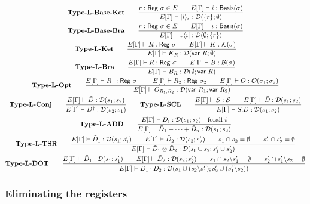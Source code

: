 \begin{gather*}
    \textbf{Type-L-Base-Ket}\qquad 
    \frac{r : \mathsf{Reg}\  \sigma \in E\qquad E[\Gamma] \vdash i : \mathsf{Basis}(\sigma)}{E[\Gamma] \vdash |i\rangle_r : \mathcal{D}(\{r\}; \emptyset)} \\
    \textbf{Type-L-Base-Bra}\qquad 
    \frac{r : \mathsf{Reg}\  \sigma \in E \qquad E[\Gamma] \vdash i : \mathsf{Basis}(\sigma)}{E[\Gamma] \vdash {}_r\langle i| : \mathcal{D}(\emptyset; \{r\})} \\
    \textbf{Type-L-Ket}\qquad 
    \frac{E[\Gamma] \vdash R : \mathsf{Reg}\  \sigma\qquad E[\Gamma] \vdash K : \mathcal{K}(\sigma)}{E[\Gamma] \vdash K_R : \mathcal{D}(\mathsf{var}\  R; \emptyset)} \\
    \textbf{Type-L-Bra}\qquad 
    \frac{E[\Gamma] \vdash R : \mathsf{Reg}\  \sigma\qquad E[\Gamma] \vdash B : \mathcal{B}(\sigma)}{E[\Gamma] \vdash B_R : \mathcal{D}(\emptyset; \mathsf{var}\  R)} \\
    \textbf{Type-L-Opt}\qquad 
    \frac{E[\Gamma] \vdash R_1 : \mathsf{Reg}\  \sigma_1\qquad 
    E[\Gamma] \vdash R_2 : \mathsf{Reg}\  \sigma_2\qquad 
    E[\Gamma] \vdash O : \mathcal{O}(\sigma_1; \sigma_2)}
    {E[\Gamma] \vdash O_{R_1;R_2} : \mathcal{D}(\mathsf{var}\  R_1; \mathsf{var}\  R_2)} \\
    \textbf{Type-L-Conj}\qquad 
    \frac{E[\Gamma] \vdash \tilde{D} : \mathcal{D}(s_1;s_2)}{E[\Gamma] \vdash \tilde{D}^\dagger : \mathcal{D}(s_2;s_1)} \qquad
    \textbf{Type-L-SCL}\qquad 
    \frac{E[\Gamma] \vdash S : \mathcal{S}\qquad E[\Gamma] \vdash \tilde{D} : \mathcal{D}(s_1;s_2)}{E[\Gamma] \vdash S.\tilde{D} : \mathcal{D}(s_1;s_2)} \\
    \textbf{Type-L-ADD}\qquad
    \frac{E[\Gamma] \vdash \tilde{D}_i : \mathcal{D}(s_1;s_2)\quad \text{forall } i}{E[\Gamma] \vdash \tilde{D}_1+\cdots+\tilde{D}_n : \mathcal{D}(s_1;s_2)} \\
    \textbf{Type-L-TSR}\qquad
    \frac{E[\Gamma] \vdash \tilde{D}_1 : \mathcal{D}(s_1;s_1')\qquad E[\Gamma] \vdash \tilde{D}_2 : \mathcal{D}(s_2;s_2')\qquad s_1\cap s_2 = \emptyset\qquad s_1'\cap s_2' = \emptyset}{E[\Gamma] \vdash \tilde{D}_1\otimes\tilde{D}_2 : \mathcal{D}(s_1\cup s_2;s_1'\cup s_2')} \\
    \textbf{Type-L-DOT}\qquad
    \frac{E[\Gamma] \vdash \tilde{D}_1 : \mathcal{D}(s_1;s_1')\qquad E[\Gamma] \vdash \tilde{D}_2 : \mathcal{D}(s_2;s_2')\qquad 
    s_1 \cap s_2 \backslash s_1' = \emptyset \qquad
    s_2' \cap s_1' \backslash s_2 = \emptyset}
    {E[\Gamma] \vdash \tilde{D}_1\cdot\tilde{D}_2 : \mathcal{D}(s_1 \cup (s_2\backslash s_1'); s_2' \cup (s_1'\backslash s_2))}
\end{gather*}

\subsubsection*{Eliminating the registers}

